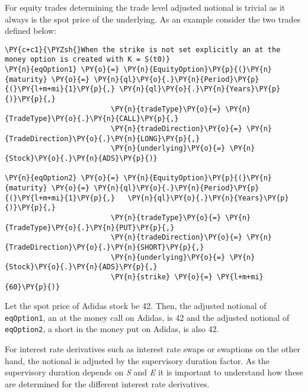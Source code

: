 For equity trades determining the trade level adjusted notional is
trivial as it always is the spot price of the underlying. As an example
consider the two trades defined below:

    \begin{tcolorbox}[breakable, size=fbox, boxrule=1pt, pad at break*=1mm,colback=cellbackground, colframe=cellborder]
\begin{Verbatim}[commandchars=\\\{\}]
\PY{c+c1}{\PYZsh{}When the strike is not set explicitly an at the money option is created with K = S(t0)}
\PY{n}{eqOption1} \PY{o}{=} \PY{n}{EquityOption}\PY{p}{(}\PY{n}{maturity} \PY{o}{=} \PY{n}{ql}\PY{o}{.}\PY{n}{Period}\PY{p}{(}\PY{l+m+mi}{1}\PY{p}{,} \PY{n}{ql}\PY{o}{.}\PY{n}{Years}\PY{p}{)}\PY{p}{,}
                         \PY{n}{tradeType}\PY{o}{=} \PY{n}{TradeType}\PY{o}{.}\PY{n}{CALL}\PY{p}{,}
                         \PY{n}{tradeDirection}\PY{o}{=} \PY{n}{TradeDirection}\PY{o}{.}\PY{n}{LONG}\PY{p}{,}
                         \PY{n}{underlying}\PY{o}{=} \PY{n}{Stock}\PY{o}{.}\PY{n}{ADS}\PY{p}{)}

\PY{n}{eqOption2} \PY{o}{=} \PY{n}{EquityOption}\PY{p}{(}\PY{n}{maturity} \PY{o}{=} \PY{n}{ql}\PY{o}{.}\PY{n}{Period}\PY{p}{(}\PY{l+m+mi}{1}\PY{p}{,}   \PY{n}{ql}\PY{o}{.}\PY{n}{Years}\PY{p}{)}\PY{p}{,}
                         \PY{n}{tradeType}\PY{o}{=} \PY{n}{TradeType}\PY{o}{.}\PY{n}{PUT}\PY{p}{,}
                         \PY{n}{tradeDirection}\PY{o}{=} \PY{n}{TradeDirection}\PY{o}{.}\PY{n}{SHORT}\PY{p}{,}
                         \PY{n}{underlying}\PY{o}{=} \PY{n}{Stock}\PY{o}{.}\PY{n}{ADS}\PY{p}{,}
                         \PY{n}{strike} \PY{o}{=} \PY{l+m+mi}{60}\PY{p}{)}
\end{Verbatim}
\end{tcolorbox}

    Let the spot price of Adidas stock be 42. Then, the adjusted notional of
\texttt{eqOption1}, an at the money call on Adidas, is 42 and the
adjusted notional of \texttt{eqOption2}, a short in the money put on
Adidas, is also 42.

    
    For interest rate derivatives such as interest rate swaps or swaptions
on the other hand, the notional is adjusted by the supervisory duration
factor. As the supervisory duration depends on \emph{S} and \emph{E} it
is important to understand how these are determined for the different
interest rate derivatives.

